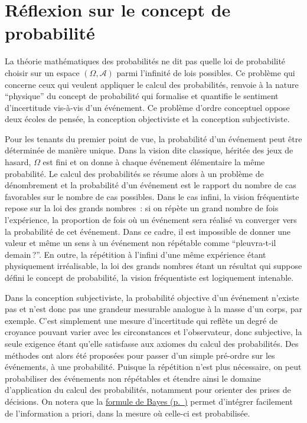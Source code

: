 \section{Réflexion sur le concept de
probabilité}\label{I-remarque-ruxe9flexion-sur-le-concept-de-probabilituxe9}

La théorie mathématiques des probabilités ne dit pas quelle loi de
probabilité choisir sur un espace \((\Omega,\mathcal{A})\) parmi
l'infinité de lois possibles. Ce problème qui concerne ceux qui veulent
appliquer le calcul des probabilités, renvoie à la nature ``physique''
du concept de probabilité qui formalise et quantifie le sentiment
d'incertitude vis-à-vis d'un événement. Ce problème d'ordre conceptuel
oppose deux écoles de pensée, la conception objectiviste et la
conception subjectiviste.

Pour les tenants du premier point de vue, la probabilité d'un événement
peut être déterminée de manière unique. Dans la vision dite classique,
héritée des jeux de hasard, \(\Omega\) est fini et on donne à chaque
événement élémentaire la même probabilité. Le calcul des probabilités se
résume alors à un problème de dénombrement et la probabilité d'un
événement est le rapport du nombre de cas favorables sur le nombre de
cas possibles. Dans le cas infini, la vision fréquentiste repose sur la
loi des grands nombres~: si on répète un grand nombre de fois
l'expérience, la proportion de fois où un événement sera réalisé va
converger vers la probabilité de cet événement. Dans ce cadre, il est
impossible de donner une valeur et même un sens à un événement non
répétable comme ``pleuvra-t-il demain\,?''. En outre, la répétition à
l'infini d'une même expérience étant physiquement irréalisable, la loi
des grands nombres étant un résultat qui suppose défini le concept de
probabilité, la vision fréquentiste est logiquement intenable.

Dans la conception subjectiviste, la probabilité objective d'un
événement n'existe pas et n'est donc pas une grandeur mesurable analogue
à la masse d'un corps, par exemple. C'est simplement une mesure
d'incertitude qui reflète un degré de croyance pouvant varier avec les
circonstances et l'observateur, donc subjective, la seule exigence étant
qu'elle satisfasse aux axiomes du calcul des probabilités. Des méthodes
ont alors été proposées pour passer d'un simple pré-ordre sur les
événements, à une probabilité. Puisque la répétition n'est plus
nécessaire, on peut probabiliser des événements non répétables et
étendre ainsi le domaine d'application du calcul des probabilités,
notamment pour orienter des prises de décisions. On notera que la
\protect\hyperref[I-bayes]{formule de Bayes (p.~\pageref*{I-bayes})}
permet d'intégrer facilement de l'information a priori, dans la mesure
où celle-ci est probabilisée.

